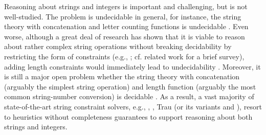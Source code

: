 



Reasoning about strings and integers is important and challenging, but is not well-studied. 
The problem is undecidable in general,  for instance, the string theory with concatenation and letter counting functions is undecidable \cite{buchi}. 
Even worse, although a great deal of research has shown that it is viable to reason about rather complex string operations without breaking decidability by %
restricting the form of constraints (e.g., \cite{CCH+18,CHL+19}; cf. related work for a brief survey), adding length constraints would immediately lead to undecidability \cite{CCH+18}. Moreover, it is still a major open problem whether the string theory with concatenation (arguably the simplest string operation) and length function (arguably the most common string-number conversion) is decidable \cite{Vijay-length}. 
%
As a result, a vast majority of  state-of-the-art string constraint solvers, e.g., {\cvc} \cite{cvc4}, {\zthree} \cite{Z3-str3}, Trau \cite{Abdulla17} (or its variants {\trauplus} \cite{AbdullaA+19} and {\zthreetrau} \cite{Z3-trau}),  
resort to heuristics without completeness guarantees to support reasoning about both strings and integers.


